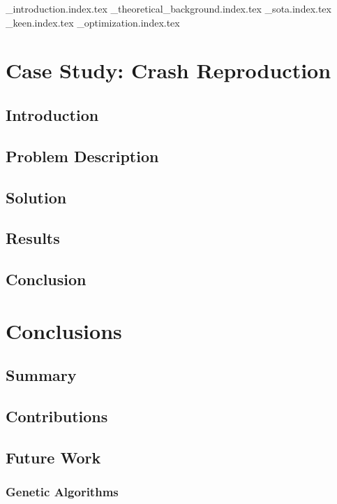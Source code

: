\setcounter{page}{1}
{_introduction.index.tex}
{_theoretical_background.index.tex}
{_sota.index.tex}
{_keen.index.tex}
{_optimization.index.tex}

\chapter{Case Study: Crash Reproduction}
\label{chap:beacon}
  \section{Introduction}
  \label{sec:introduction}
    \Blindtext
  \section{Problem Description}
  \label{sec:problem_description}
    \Blindtext
  \section{Solution}
  \label{sec:solution}
    \Blindtext
  \section{Results}
  \label{sec:results}
    \Blindtext
  \section{Conclusion}
  \label{sec:conclusion}
    \Blindtext

\chapter{Conclusions}
\label{chap:conclusions}
  \section{Summary}
  \label{sec:summary}
    \Blindtext
  \section{Contributions}
  \label{sec:contributions}
    \Blindtext
  \section{Future Work}
  \label{sec:future_work}
    \subsection{Genetic Algorithms}
    \label{sec:future:ga}
